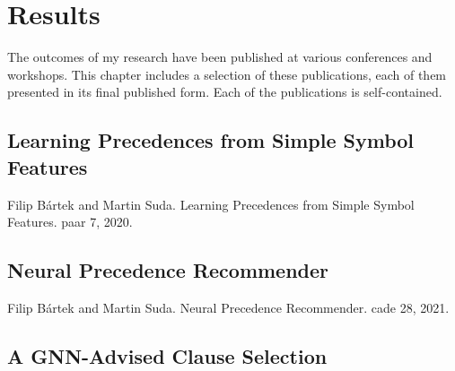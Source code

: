 \newcommand*{\IncludePaper}[2][height=\paperheight-1.5in]{}

\chapter{Results}

The outcomes of my research have been published at various conferences and workshops.
This chapter includes a selection of these publications, each of them presented in its final published form.
Each of the publications is self-contained.


\section{Learning Precedences from Simple Symbol Features}
\label{sec:results:simple}

Filip Bártek and Martin Suda.
Learning Precedences from Simple Symbol Features.
\Acrlong{paar} 7, 2020.
\cite{DBLP:conf/cade/Bartek020}

\IncludePaper{publications/simple.pdf}

\section{Neural Precedence Recommender}
\label{sec:results:npr}

Filip Bártek and Martin Suda.
Neural Precedence Recommender.
\Acrlong{cade} 28, 2021.
\cite{DBLP:conf/cade/Bartek021}

\IncludePaper{publications/Neural Precedence Recommender.pdf}

\section{A GNN-Advised Clause Selection}
\label{sec:results:selection}

